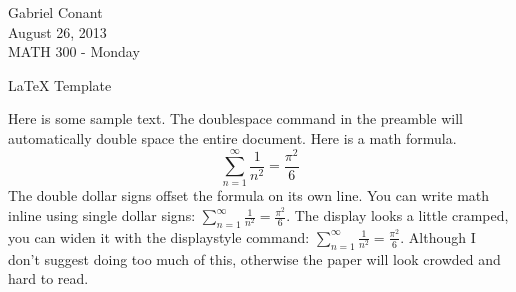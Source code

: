 \documentclass[12pt]{article}
\begin{document}
 

\noindent Gabriel Conant\\
August 26, 2013\\
MATH 300 - Monday

\begin{center}
LaTeX Template
\end{center}

Here is some sample text. The doublespace command in the preamble will automatically double space the entire document. Here is a math formula.
$$
\sum_{n=1}^\infty\frac{1}{n^2}=\frac{\pi^2}{6}
$$
The double dollar signs offset the formula on its own line. You can write math inline using single dollar signs: $\sum_{n=1}^\infty\frac{1}{n^2}=\frac{\pi^2}{6}$. The display looks a little cramped, you can widen it with the displaystyle command: $\displaystyle\sum_{n=1}^\infty\frac{1}{n^2}=\frac{\pi^2}{6}$. Although I don't suggest doing too much of this, otherwise the paper will look crowded and hard to read.
\end{document}
